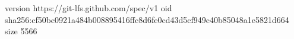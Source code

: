 version https://git-lfs.github.com/spec/v1
oid sha256:cf50bc0921a484b008895416ffc8d6fe0cd43d5cf949c40b85048a1e5821d664
size 5566
